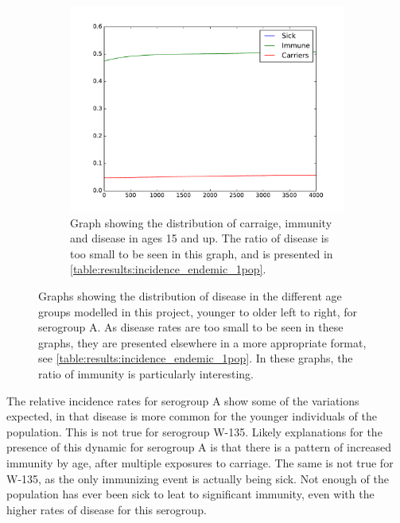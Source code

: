 \documentclass[10pt,a4paper]{article}
\begin{document}
\begin{figure}
\begin{subfigure}{0.3\textwidth}
	\end{subfigure}
	\begin{subfigure}{0.3\textwidth}
		\includegraphics[width=\textwidth]{figures/endemic_1pop_A_adults}
		\caption{Graph showing the distribution of carraige, immunity and disease in ages 15 and up. The ratio of disease is too small to be seen in this graph, and is presented in \cref{table:results:incidence_endemic_1pop}.} \label{fig:results:agedist_A_adults}
	\end{subfigure}
	\caption{Graphs showing the distribution of disease in the different age groups modelled in this project, younger to older left to right, for serogroup A. As disease rates are too small to be seen in these graphs, they are presented elsewhere in a more appropriate format, see \cref{table:results:incidence_endemic_1pop}. In these graphs, the ratio of immunity is particularly interesting.} \label{fig:results:agedist_A}
\end{figure}

The relative incidence rates for serogroup A show some of the variations expected, in that disease is more common for the younger individuals of the population. This is not true for serogroup W-135. Likely explanations for the presence of this dynamic for serogroup A is that there is a pattern of increased immunity by age, after multiple exposures to carriage. The same is not true for W-135, as the only immunizing event is actually being sick. Not enough of the population has ever been sick to leat to significant immunity, even with the higher rates of disease for this serogroup.
\end{document}
